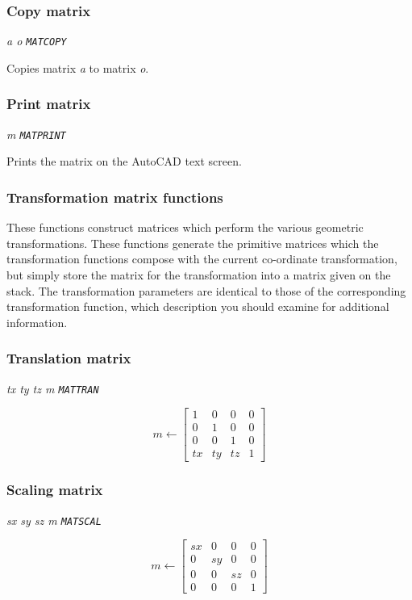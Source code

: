 \documentclass{article}
\begin{document}
\subsubsection{Copy matrix}

{\em a o {\tt MATCOPY}}

Copies matrix {\em a} to matrix {\em o}.

\subsubsection{Print matrix}

{\em m {\tt MATPRINT}}

Prints the matrix on the AutoCAD text screen.

\subsubsection{Transformation matrix functions}

These functions construct matrices which perform the various
geometric transformations.  These functions generate the primitive
matrices which the transformation functions compose with the current
co-ordinate transformation, but simply store the matrix for the
transformation into a matrix given on the stack.  The
transformation parameters are identical to those of the corresponding
transformation function, which description you should examine for
additional information.

\subsubsection{Translation matrix}

{\em tx ty tz m {\tt MATTRAN}}

\[ m \leftarrow \left[ \begin{array}{cccc}
        1 & 0 & 0 & 0 \\
        0 & 1 & 0 & 0 \\
        0 & 0 & 1 & 0 \\
        \mathit{tx} & \mathit{ty} & \mathit{tz} & 1
\end{array} \right] \]

\subsubsection{Scaling matrix}

{\em sx sy sz m {\tt MATSCAL}}

\[ m \leftarrow \left[ \begin{array}{cccc}
        \mathit{sx} & 0 & 0 & 0 \\
        0 & \mathit{sy} & 0 & 0 \\
        0 & 0 & \mathit{sz} & 0 \\
        0 & 0 & 0 & 1
\end{array} \right] \]
\end{document}

